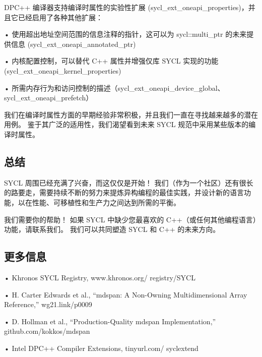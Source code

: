 DPC++ 编译器支持编译时属性的实验性扩展 (sycl\_ext\_oneapi\_properties)，并且它已经启用了各种其他扩展：

• 使用超出地址空间范围的信息注释的指针，这可以为 sycl::multi\_ptr 的未来提供信息 (sycl\_ext\_oneapi\_annotated\_ptr)

• 内核配置控制，可以替代 C++ 属性并增强仅库 SYCL 实现的功能 (sycl\_ext\_oneapi\_kernel\_properties)

• 所需内存行为和访问控制的描述（sycl\_ext\_oneapi\_device\_global、sycl\_ext\_oneapi\_prefetch）

我们在编译时属性方面的早期经验非常积极，并且我们一直在寻找越来越多的潜在用例。 鉴于其广泛的适用性，我们渴望看到未来 SYCL 规范中采用某些版本的编译时属性。

\subsection{总结}
SYCL 周围已经充满了兴奋，而这仅仅是开始！ 我们（作为一个社区）还有很长的路要走，需要持续不断的努力来提炼异构编程的最佳实践，并设计新的语言功能，以在性能、可移植性和生产力之间达到所需的平衡。

我们需要你的帮助！ 如果 SYCL 中缺少您最喜欢的 C++（或任何其他编程语言）功能，请联系我们。 我们可以共同塑造 SYCL 和 C++ 的未来方向。

\subsection{更多信息}
• Khronos SYCL Registry, www.khronos.org/ registry/SYCL

• H. Carter Edwards et al., “mdspan: A Non-Owning Multidimensional Array Reference,” wg21.link/p0009

• D. Hollman et al., “Production-Quality mdspan Implementation,” github.com/kokkos/mdspan

• Intel DPC++ Compiler Extensions, tinyurl.com/ syclextend